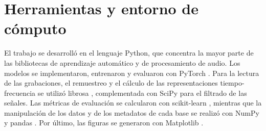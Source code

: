 




\section{Herramientas y entorno de cómputo}
\label{sec:herramientas}

El trabajo se desarrolló en el lenguaje Python, que concentra la mayor parte de las bibliotecas de
aprendizaje automático y de procesamiento de audio. Los modelos se implementaron, entrenaron y
evaluaron con PyTorch \citep{paszke2019pytorch}. Para la lectura de las grabaciones, el remuestreo y
el cálculo de las representaciones tiempo-frecuencia se utilizó librosa \citep{mcfee2015librosa},
complementada con SciPy \citep{virtanen2020scipy} para el filtrado de las señales. Las métricas de
evaluación se calcularon con scikit-learn \citep{pedregosa2011scikit}, mientras que la
manipulación de los datos y de los metadatos de cada base se realizó con NumPy
\citep{harris2020numpy} y pandas \citep{mckinney2010pandas}. Por último, las figuras se generaron
con Matplotlib \citep{hunter2007matplotlib}.

